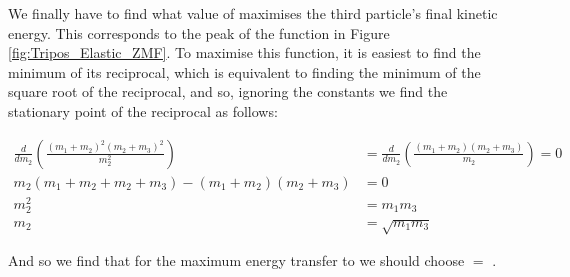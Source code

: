 \begin{problem}
{We finally have to find what value of  maximises the third particle's final kinetic energy. This corresponds to the peak of the function in Figure \ref{fig:Tripos_Elastic_ZMF}. To maximise this function, it is easiest to find the minimum of its reciprocal, which is equivalent to finding the minimum of the square root of the reciprocal, and so, ignoring the constants we find the stationary point of the reciprocal as follows:

\begin{eqnarray*}
\frac{d}{d m_2} \left( \frac{(m_{1}+m_{2})^{2} (m_{2}+m_{3})^{2}}{m_{2}^2}\right) &=\frac{d}{d m_2}\left(\frac{(m_{1}+m_{2})(m_{2}+m_{3})}{m_{2}}\right) =0 \\
m_2\left(m_1 + m_2 + m_2 +m_3\right)-\left(m_{1}+m_{2}\right)\left(m_{2}+m_{3}\right) &= 0 \\
m_2^2 &= m_1 m_3 \\
m_2 &= \sqrt{m_1 m_3}
\end{eqnarray*}

And so we find that for the maximum energy transfer to  we should choose  $=$ .
}
\end{problem}